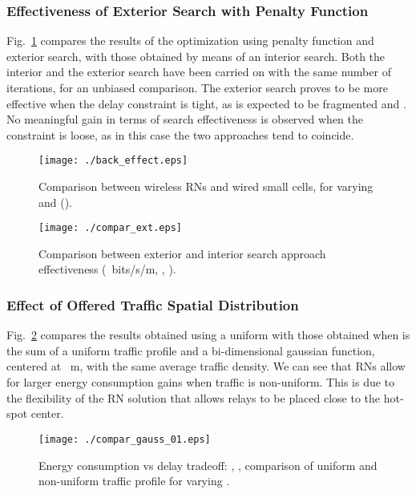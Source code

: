 \documentclass[draftcls,onecolumn]{IEEEtran}
\theoremstyle{plain}
\theoremstyle{definition}
\begin{document}
\subsubsection{Effectiveness of Exterior Search with Penalty Function}
Fig.~\ref{fig:compar_ext} compares the results of the optimization using penalty function and exterior search, with those obtained by means of an interior search. Both the interior and the exterior search have been carried on with the same number of iterations, for an unbiased comparison. The exterior search proves to be more effective when the delay constraint is tight, as  is expected to be fragmented and . No meaningful gain in terms of search effectiveness is observed when the constraint is loose, as in this case the two approaches tend to coincide.
\begin{figure}
\centering
\begin{minipage}{.47\textwidth}
\centering
\texttt{[image: ./back\_effect.eps]} 
\caption{Comparison between wireless RNs and wired small cells, for varying  and  ().}
\label{fig:back_effect}
\end{minipage}\hfill
\begin{minipage}{.47\textwidth}
\centering
\texttt{[image: ./compar\_ext.eps]}
\caption{Comparison between exterior and interior search approach effectiveness (~bits/s/m, , ).}
\label{fig:compar_ext}
\end{minipage}
\end{figure}

\subsubsection{Effect of Offered Traffic Spatial Distribution}\label{non_unif}
Fig.~\ref{fig:compar_gauss} compares the results obtained using a uniform  with those obtained when  is the sum of a uniform traffic profile and a bi-dimensional gaussian function, centered at ~m, with the same average traffic density. We can see that RNs allow for larger energy consumption gains when traffic is non-uniform. This is due to the flexibility of the RN solution that allows relays to be placed close to the hot-spot center. 
\begin{figure}[]
 \centering
\texttt{[image: ./compar\_gauss\_01.eps]} 
 \caption{Energy consumption vs delay tradeoff: , , comparison of uniform and non-uniform traffic profile  for varying .}
\label{fig:compar_gauss} 
\end{figure} 
\end{document}
